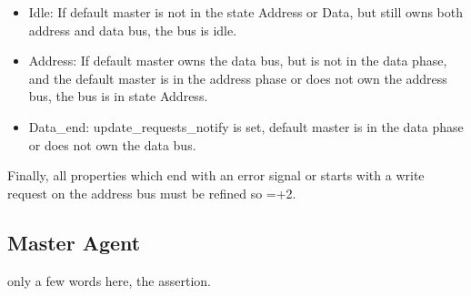\begin{itemize}
 \item Idle: If default master is not in the state Address or Data, but still owns both address and data bus, the bus is idle.
 \item Address: If default master owns the data bus, but is not in the data phase, and the default master is in the address phase or does not own the address bus, the bus is in state Address. 
 \item Data\_end: update\_requests\_notify is set, default master is in the data phase or does not own the data bus.  
\end{itemize}

Finally, all properties which end with an error signal or starts with a write request on the address bus must be refined so =+2.

\subsection{Master Agent}
only a few words here, the assertion. 

